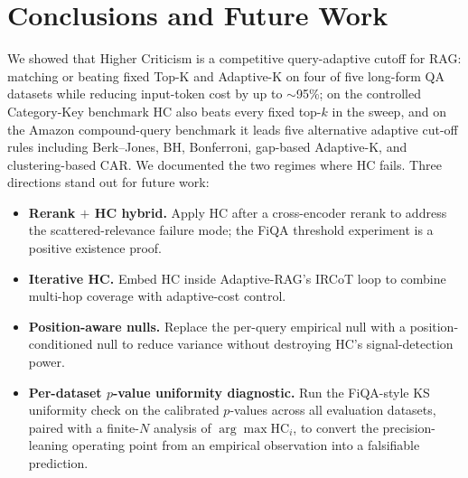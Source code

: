 \documentclass[letterpaper]{article}
\begin{document}
\section{Conclusions and Future Work}
\label{sec:future}

We showed that Higher Criticism is a competitive query-adaptive
cutoff for RAG: matching or beating fixed Top-K and Adaptive-K on
four of five long-form QA datasets while reducing input-token cost
by up to $\sim$95\%; on the controlled Category-Key benchmark HC
also beats every fixed top-$k$ in the sweep, and on the Amazon
compound-query benchmark it leads five alternative adaptive
cut-off rules including Berk--Jones, BH, Bonferroni, gap-based
Adaptive-K, and clustering-based CAR. We documented the two
regimes where HC fails. Three directions stand out for future
work:
\begin{itemize}
\item \textbf{Rerank $+$ HC hybrid.} Apply HC after a cross-encoder
rerank to address the scattered-relevance failure mode; the FiQA
threshold experiment is a positive existence proof.
\item \textbf{Iterative HC.} Embed HC inside Adaptive-RAG's IRCoT
loop to combine multi-hop coverage with adaptive-cost control.
\item \textbf{Position-aware nulls.} Replace the per-query
empirical null with a position-conditioned null to reduce variance
without destroying HC's signal-detection power.
\item \textbf{Per-dataset $p$-value uniformity diagnostic.} Run the
FiQA-style KS uniformity check on the calibrated $p$-values across
all evaluation datasets, paired with a finite-$N$ analysis of
$\arg\max \mathrm{HC}_i$, to convert the precision-leaning operating
point from an empirical observation into a falsifiable prediction.
\end{itemize}




\clearpage
\onecolumn
\end{document}
